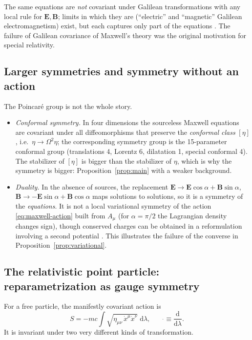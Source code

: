 \documentclass[11pt,a4paper,openany]{book}
\theoremstyle{definition}
\theoremstyle{plain}
\theoremstyle{remark}
\newcommand{\dd}{\mathrm{d}}
\newcommand{\vE}{\bm{E}}
\newcommand{\vB}{\bm{B}}
\begin{document}
The same equations are \emph{not} covariant under Galilean transformations
with any local rule for $\vE,\vB$; limits in which they are (``electric'' and
``magnetic'' Galilean electromagnetism) exist, but each captures only part of
the equations \cite{lbll}. The failure of Galilean covariance of Maxwell's
theory was the original motivation for special relativity.

\subsection{Larger symmetries and symmetry without an action}

The Poincar\'e group is not the whole story.
\begin{itemize}[leftmargin=1.6em,itemsep=2pt]
\item \emph{Conformal symmetry.} In four dimensions the sourceless Maxwell
  equations are covariant under all diffeomorphisms that preserve the
  \emph{conformal class} $[\eta]$, i.e.\ $\eta\to\Omega^2\eta$; the
  corresponding symmetry group is the 15-parameter conformal group
  (translations 4, Lorentz 6, dilatation 1, special conformal 4). The
  stabilizer of $[\eta]$ is bigger than the stabilizer of $\eta$, which is why
  the symmetry is bigger: Proposition~\ref{prop:main} with a weaker background.
\item \emph{Duality.} In the absence of sources, the replacement
  $\vE\to\vE\cos\alpha+\vB\sin\alpha$, $\vB\to-\vE\sin\alpha+\vB\cos\alpha$
  maps solutions to solutions, so it is a symmetry of the \emph{equations}.
  It is not a local variational symmetry of the action \eqref{eq:maxwell-action}
  built from $A_\mu$ (for $\alpha=\pi/2$ the Lagrangian density changes sign),
  though conserved charges can be obtained in a reformulation involving a
  second potential \cite{deser}. This illustrates the failure of the converse
  in Proposition~\ref{prop:variational}.
\end{itemize}

\subsection{The relativistic point particle: reparametrization as gauge symmetry}

For a free particle, the manifestly covariant action is
\begin{equation}\label{eq:particle}
  S=-mc\int\sqrt{\eta_{\mu\nu}\,\dot x^\mu\dot x^\nu}\;\dd\lambda ,
  \qquad \dot{}\equiv\frac{\dd}{\dd\lambda}.
\end{equation}
It is invariant under two very different kinds of transformation.
\end{document}
